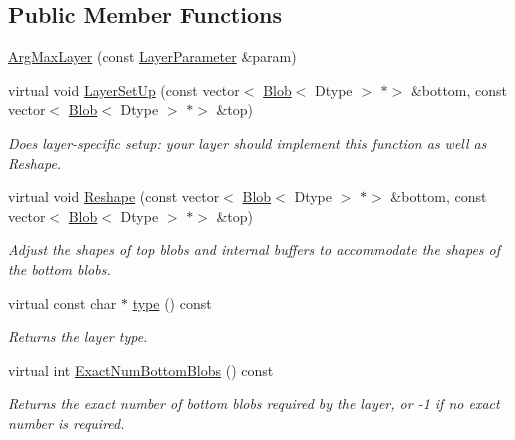 \subsection*{Public Member Functions}
\begin{DoxyCompactItemize}
\item 
\mbox{\hyperlink{classcaffe_1_1_arg_max_layer_a77429601f3d7f27b48720a1b703491be}{Arg\+Max\+Layer}} (const \mbox{\hyperlink{classcaffe_1_1_layer_parameter}{Layer\+Parameter}} \&param)
\item 
virtual void \mbox{\hyperlink{classcaffe_1_1_arg_max_layer_a53069bd5efc4639de93a8111da772572}{Layer\+Set\+Up}} (const vector$<$ \mbox{\hyperlink{classcaffe_1_1_blob}{Blob}}$<$ Dtype $>$ $\ast$$>$ \&bottom, const vector$<$ \mbox{\hyperlink{classcaffe_1_1_blob}{Blob}}$<$ Dtype $>$ $\ast$$>$ \&top)
\begin{DoxyCompactList}\small\item\em Does layer-\/specific setup\+: your layer should implement this function as well as Reshape. \end{DoxyCompactList}\item 
virtual void \mbox{\hyperlink{classcaffe_1_1_arg_max_layer_a291a2c548c28e7ab02ddac0cfd3cbdad}{Reshape}} (const vector$<$ \mbox{\hyperlink{classcaffe_1_1_blob}{Blob}}$<$ Dtype $>$ $\ast$$>$ \&bottom, const vector$<$ \mbox{\hyperlink{classcaffe_1_1_blob}{Blob}}$<$ Dtype $>$ $\ast$$>$ \&top)
\begin{DoxyCompactList}\small\item\em Adjust the shapes of top blobs and internal buffers to accommodate the shapes of the bottom blobs. \end{DoxyCompactList}\item 
\mbox{\label{classcaffe_1_1_arg_max_layer_af4826eb75118ddf465b7c2ab99b10b45}} 
virtual const char $\ast$ \mbox{\hyperlink{classcaffe_1_1_arg_max_layer_af4826eb75118ddf465b7c2ab99b10b45}{type}} () const
\begin{DoxyCompactList}\small\item\em Returns the layer type. \end{DoxyCompactList}\item 
virtual int \mbox{\hyperlink{classcaffe_1_1_arg_max_layer_a786fb4163cd0a31a564100ce7e4b74b2}{Exact\+Num\+Bottom\+Blobs}} () const
\begin{DoxyCompactList}\small\item\em Returns the exact number of bottom blobs required by the layer, or -\/1 if no exact number is required. \end{DoxyCompactList}\item 

\end{DoxyCompactItemize}
